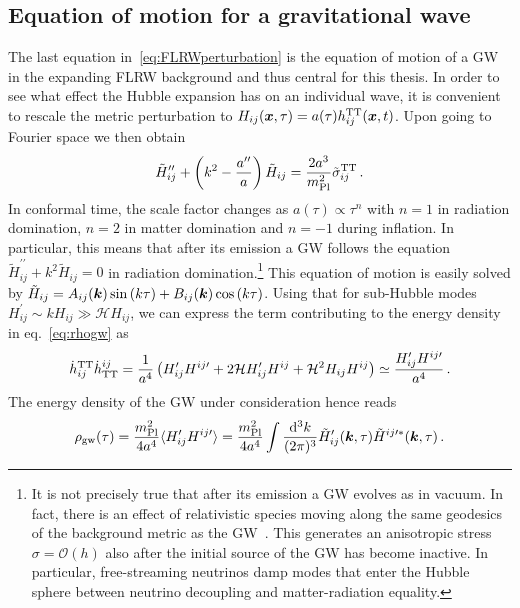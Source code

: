 \subsection{Equation of motion for a gravitational wave} \label{sec:eom}
The last equation in~\eqref{eq:FLRWperturbation} is the equation of motion of a \ac{GW} in the expanding \ac{FLRW} background and thus central for this thesis. In order to see what effect the Hubble expansion has on an individual wave, it is convenient to rescale the metric perturbation to $H_{ij}(\bm{x},\tau) = a(\tau) h_{ij}^{\text{TT}} (\bm{x},t)$. Upon going to Fourier space we then obtain
\begin{align}
	\tilde{H}_{ij}^{\prime \prime} + \left( k^2 - \frac{a^{\prime \prime}}{a}  \right) \tilde{H}_{ij}  = \frac{2 a^3}{m_\text{Pl}^2} \tilde{\sigma}_{ij}^{\text{TT}} \, . \label{eq:eom}
\end{align}
In conformal time, the scale factor changes as $a(\tau) \propto \tau^n$ with $n = 1$ in  radiation domination, $n=2$ in matter domination and $n = -1$ during inflation. In particular, this means that after its emission a \ac{GW} follows  the equation $\tilde{H}_{ij}^{\prime \prime} + k^2 \tilde{H}_{ij} = 0$ in radiation domination.\footnote{It is not precisely true that after its emission a \ac{GW} evolves as in vacuum. In fact, there is an effect of relativistic species moving along the same geodesics of the background metric as the \ac{GW}~\cite{Maggiore:2018sht,Hook:2020phx}. This generates an anisotropic stress $\sigma = \mathcal{O}(h)$ also after the initial source of the \ac{GW} has become inactive. In particular, free-streaming neutrinos damp modes that enter the Hubble sphere between neutrino decoupling and matter-radiation equality.} This equation of motion is  easily solved by $\tilde{H}_{ij} = A_{ij}(\bm{k}) \sin \left( k \tau \right) +  B_{ij}(\bm{k}) \cos \left( k \tau \right)$. Using that for sub-Hubble modes $H_{ij}^\prime \sim k H_{ij}  \gg \mathcal{H} H_{ij}$, we can express the term contributing to the energy density in eq.~\eqref{eq:rhogw} as
\begin{align}
	\dot{h}_{ij}^{\text{TT}} \dot{h}_{\text{TT}}^{ij} = \frac{1}{a^4} \left( H_{ij}^\prime H^{ij\prime} + 2 \mathcal{H} H_{ij}^\prime H^{ij} + \mathcal{H}^2 H_{ij} H^{ij} \right) \simeq \frac{H_{ij}^\prime H^{ij\prime}}{a^4} \, .
\end{align}
The energy density of the \ac{GW} under consideration hence reads
\begin{align}
	\rho_{\text{gw}}(\tau) = \frac{m_\text{Pl}^2}{4a^4} \langle H_{ij}^\prime H^{ij\prime} \rangle  = \frac{m_\text{Pl}^2}{4a^4} \int \frac{\mathop{}\!\mathrm{d}^3 k}{(2\pi)^3}  \tilde{H}_{ij}^\prime(\bm{k}, \tau) \tilde{H}^{ij\prime *}(\bm{k}, \tau)  \, .
\end{align}
